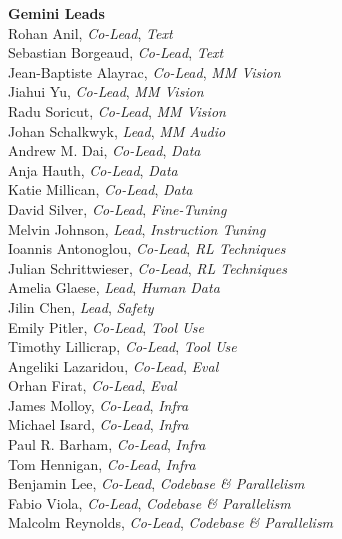 \begin{minipage}[t]{0.55\linewidth}
\noindent
\textbf{Gemini Leads} \\
\noindent
Rohan Anil, {\textit{Co-Lead}, \textit{Text}} \\
Sebastian Borgeaud, {\textit{Co-Lead}, \textit{Text}} \\
Jean-Baptiste Alayrac, \textit{Co-Lead}, \textit{MM Vision} \\
Jiahui Yu, \textit{Co-Lead}, \textit{MM Vision} \\
Radu Soricut, \textit{Co-Lead}, \textit{MM Vision} \\
Johan Schalkwyk, \textit{Lead}, \textit{MM Audio} \\
Andrew M. Dai, \textit{Co-Lead}, \textit{Data} \\
Anja Hauth, \textit{Co-Lead}, \textit{Data} \\
Katie Millican, \textit{Co-Lead}, \textit{Data} \\
David Silver, \textit{Co-Lead}, \textit{Fine-Tuning} \\
Melvin Johnson, \textit{Lead}, \textit{Instruction Tuning} \\
Ioannis Antonoglou, \textit{Co-Lead}, \textit{RL Techniques} \\
Julian Schrittwieser, \textit{Co-Lead}, \textit{RL Techniques} \\
Amelia Glaese, \textit{Lead}, \textit{Human Data} \\
Jilin Chen, \textit{Lead}, \textit{Safety} \\
Emily Pitler, \textit{Co-Lead}, \textit{Tool Use} \\
Timothy Lillicrap, \textit{Co-Lead}, \textit{Tool Use} \\
Angeliki Lazaridou, \textit{Co-Lead}, \textit{Eval} \\
Orhan Firat, \textit{Co-Lead}, \textit{Eval} \\
James Molloy, \textit{Co-Lead}, \textit{Infra} \\
Michael Isard, \textit{Co-Lead}, \textit{Infra} \\
Paul R. Barham, \textit{Co-Lead}, \textit{Infra} \\
Tom Hennigan, \textit{Co-Lead}, \textit{Infra} \\
Benjamin Lee, \textit{Co-Lead}, \textit{Codebase \& Parallelism} \\
Fabio Viola, \textit{Co-Lead}, \textit{Codebase \& Parallelism} \\
Malcolm Reynolds, \textit{Co-Lead}, \textit{Codebase \& Parallelism}\\

\end{minipage}
